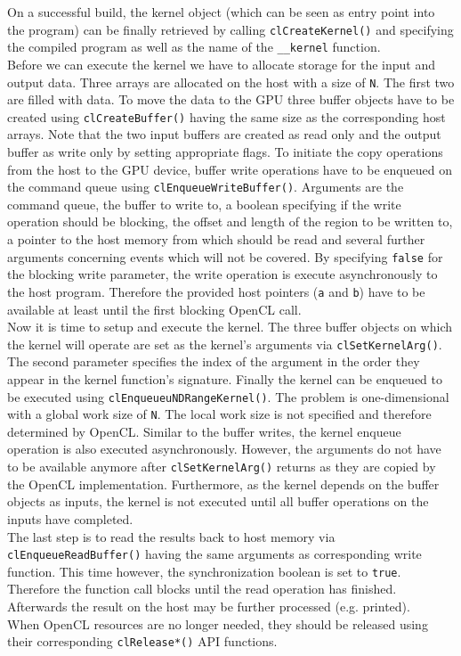 On a successful build, the kernel object (which can be seen as entry point into the program) can be finally retrieved by calling \lstinline!clCreateKernel()! and specifying the compiled program as well as the name of the \lstinline!__kernel! function. \\
Before we can execute the kernel we have to allocate storage for the input and output data. Three arrays are allocated on the host with a size of \lstinline!N!. The first two are filled with data. To move the data to the GPU three buffer objects have to be created using \lstinline!clCreateBuffer()! having the same size as the corresponding host arrays. Note that the two input buffers are created as read only and the output buffer as write only by setting appropriate flags. To initiate the copy operations from the host to the GPU device, buffer write operations have to be enqueued on the command queue using \lstinline!clEnqueueWriteBuffer()!. Arguments are the command queue, the buffer to write to, a boolean specifying if the write operation should be blocking, the offset and length of the region to be written to, a pointer to the host memory from which should be read and several further arguments concerning events which will not be covered. By specifying \lstinline!false! for the blocking write parameter, the write operation is execute asynchronously to the host program. Therefore the provided host pointers (\lstinline!a! and \lstinline!b!) have to be available at least until the first blocking OpenCL call. \\
Now it is time to setup and execute the kernel. The three buffer objects on which the kernel will operate are set as the kernel's arguments via \lstinline!clSetKernelArg()!. The second parameter specifies the index of the argument in the order they appear in the kernel function's signature. Finally the kernel can be enqueued to be executed using \lstinline!clEnqueueuNDRangeKernel()!. The problem is one-dimensional with a global work size of \lstinline!N!. The local work size is not specified and therefore determined by OpenCL. Similar to the buffer writes, the kernel enqueue operation is also executed asynchronously. However, the arguments do not have to be available anymore after \lstinline!clSetKernelArg()! returns as they are copied by the OpenCL implementation. Furthermore, as the kernel depends on the buffer objects as inputs, the kernel is not executed until all buffer operations on the inputs have completed. \\
The last step is to read the results back to host memory via \lstinline!clEnqueueReadBuffer()! having the same arguments as corresponding write function. This time however, the synchronization boolean is set to \lstinline!true!. Therefore the function call blocks until the read operation has finished. Afterwards the result on the host may be further processed (e.g. printed). \\
When OpenCL resources are no longer needed, they should be released using their corresponding \lstinline!clRelease*()! API functions.
